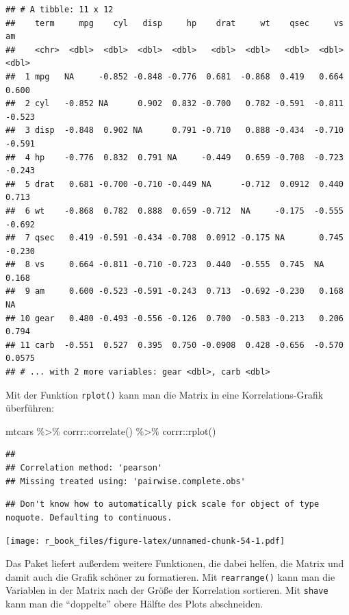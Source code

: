 \documentclass[
]{book}
\newenvironment{Shaded}{\begin{snugshade}}{\end{snugshade}}
\newcommand{\FunctionTok}[1]{\textcolor[rgb]{0.00,0.00,0.00}{#1}}
\newcommand{\NormalTok}[1]{#1}
\newcommand{\SpecialCharTok}[1]{\textcolor[rgb]{0.00,0.00,0.00}{#1}}
\begin{document}
\begin{verbatim}
## # A tibble: 11 x 12
##    term     mpg    cyl   disp     hp    drat     wt    qsec     vs      am
##    <chr>  <dbl>  <dbl>  <dbl>  <dbl>   <dbl>  <dbl>   <dbl>  <dbl>   <dbl>
##  1 mpg   NA     -0.852 -0.848 -0.776  0.681  -0.868  0.419   0.664  0.600 
##  2 cyl   -0.852 NA      0.902  0.832 -0.700   0.782 -0.591  -0.811 -0.523 
##  3 disp  -0.848  0.902 NA      0.791 -0.710   0.888 -0.434  -0.710 -0.591 
##  4 hp    -0.776  0.832  0.791 NA     -0.449   0.659 -0.708  -0.723 -0.243 
##  5 drat   0.681 -0.700 -0.710 -0.449 NA      -0.712  0.0912  0.440  0.713 
##  6 wt    -0.868  0.782  0.888  0.659 -0.712  NA     -0.175  -0.555 -0.692 
##  7 qsec   0.419 -0.591 -0.434 -0.708  0.0912 -0.175 NA       0.745 -0.230 
##  8 vs     0.664 -0.811 -0.710 -0.723  0.440  -0.555  0.745  NA      0.168 
##  9 am     0.600 -0.523 -0.591 -0.243  0.713  -0.692 -0.230   0.168 NA     
## 10 gear   0.480 -0.493 -0.556 -0.126  0.700  -0.583 -0.213   0.206  0.794 
## 11 carb  -0.551  0.527  0.395  0.750 -0.0908  0.428 -0.656  -0.570  0.0575
## # ... with 2 more variables: gear <dbl>, carb <dbl>
\end{verbatim}

Mit der Funktion \texttt{rplot()} kann man die Matrix in eine Korrelations-Grafik überführen:

\begin{Shaded}
\begin{Highlighting}[]
\NormalTok{mtcars }\SpecialCharTok{\%\textgreater{}\%} 
\NormalTok{  corrr}\SpecialCharTok{::}\FunctionTok{correlate}\NormalTok{() }\SpecialCharTok{\%\textgreater{}\%}
\NormalTok{  corrr}\SpecialCharTok{::}\FunctionTok{rplot}\NormalTok{()}
\end{Highlighting}
\end{Shaded}

\begin{verbatim}
## 
## Correlation method: 'pearson'
## Missing treated using: 'pairwise.complete.obs'
\end{verbatim}

\begin{verbatim}
## Don't know how to automatically pick scale for object of type noquote. Defaulting to continuous.
\end{verbatim}

\texttt{[image: r\_book\_files/figure-latex/unnamed-chunk-54-1.pdf]}

Das Paket liefert außerdem weitere Funktionen, die dabei helfen, die Matrix und damit auch die Grafik schöner zu formatieren. Mit \texttt{rearrange()} kann man die Variablen in der Matrix nach der Größe der Korrelation sortieren. Mit \texttt{shave} kann man die ``doppelte'' obere Hälfte des Plots abschneiden.
\end{document}

